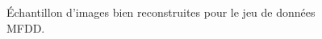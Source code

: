 \documentclass[a4paper]{article}
\begin{document}
\begin{figure}[h]
    \caption{Échantillon d'images bien reconstruites pour le jeu de données MFDD.}
\label{fig:num_reconstructed}
\end{figure}
\end{document}
